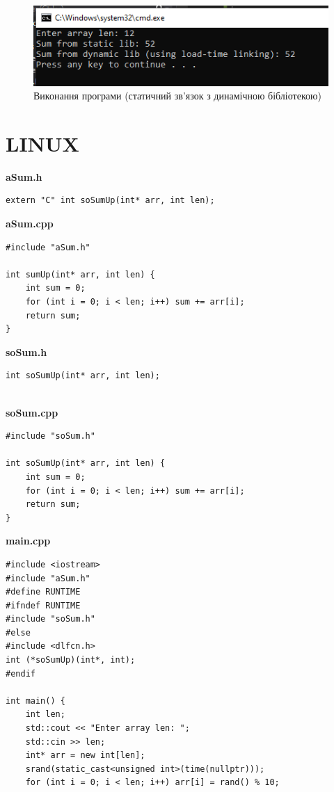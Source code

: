\documentclass{article}
\begin{document}
\begin{normalsize}
	\begin{figure}[H]
		\centering
		\includegraphics[scale=0.85]{2}
		\caption{Виконання програми (статичний зв'язок з динамічною бібліотекою)}
	\end{figure}

	\section*{LINUX}
	\textbf{aSum.h}
	\begin{lstlisting}
extern "C" int soSumUp(int* arr, int len);	
	\end{lstlisting}
	
	\noindent\textbf{aSum.cpp}
	\begin{lstlisting}
#include "aSum.h"

int sumUp(int* arr, int len) {
	int sum = 0;
	for (int i = 0; i < len; i++) sum += arr[i];
	return sum;
}

	\end{lstlisting}
	
	\noindent\textbf{soSum.h}
	\begin{lstlisting}
int soSumUp(int* arr, int len);
		
	\end{lstlisting}
	
	\noindent\textbf{soSum.cpp}
	\begin{lstlisting}
#include "soSum.h"

int soSumUp(int* arr, int len) {
	int sum = 0;
	for (int i = 0; i < len; i++) sum += arr[i];
	return sum;
}

	\end{lstlisting}
	
	\noindent\textbf{main.cpp}
	\begin{lstlisting}
#include <iostream>
#include "aSum.h"
#define RUNTIME
#ifndef RUNTIME
#include "soSum.h"
#else
#include <dlfcn.h>
int (*soSumUp)(int*, int);
#endif

int main() {
	int len;
	std::cout << "Enter array len: ";
	std::cin >> len;
	int* arr = new int[len];
	srand(static_cast<unsigned int>(time(nullptr)));
	for (int i = 0; i < len; i++) arr[i] = rand() % 10;
	

\end{lstlisting}
\end{normalsize}
\end{document}
